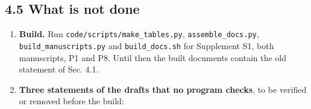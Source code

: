 \documentclass[
  10pt,
]{article}
\providecommand{\tightlist}{%
  \setlength{\itemsep}{0pt}\setlength{\parskip}{0pt}}
\begin{document}
\hypertarget{what-is-not-done}{%
\subsection{4.5 What is not done}\label{what-is-not-done}}

\begin{enumerate}
\def\labelenumi{\arabic{enumi}.}
\tightlist
\item
  \textbf{Build.} Run \texttt{code/scripts/make\_tables.py},
  \texttt{assemble\_docs.py}, \texttt{build\_manuscripts.py} and
  \texttt{build\_docs.sh} for Supplement S1, both manuscripts, P1 and
  P8. Until then the built documents contain the old statement of Sec.
  4.1.
\item
  \textbf{Three statements of the drafts that no program checks}, to be
  verified or removed before the build:


\end{enumerate}
\end{document}
